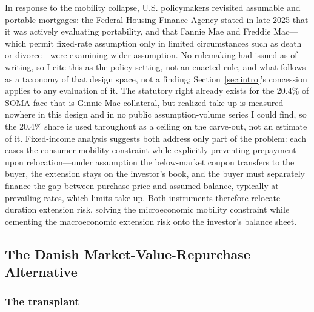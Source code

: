 \documentclass[12pt]{article}
\begin{document}
In response to the mobility collapse, U.S. policymakers revisited assumable and portable mortgages: the Federal Housing Finance Agency stated in late 2025 that it was actively evaluating portability, and that Fannie Mae and Freddie Mac---which permit fixed-rate assumption only in limited circumstances such as death or divorce---were examining wider assumption. No rulemaking had issued as of writing, so I cite this as the policy setting, not an enacted rule, and what follows as a taxonomy of that design space, not a finding; Section~\ref{sec:intro}'s concession applies to any evaluation of it. The statutory right already exists for the 20.4\% of SOMA face that is Ginnie Mae collateral, but realized take-up is measured nowhere in this design and in no public assumption-volume series I could find, so the 20.4\% share is used throughout as a ceiling on the carve-out, not an estimate of it. Fixed-income analysis suggests both address only part of the problem: each eases the consumer mobility constraint while explicitly preventing prepayment upon relocation---under assumption the below-market coupon transfers to the buyer, the extension stays on the investor's book, and the buyer must separately finance the gap between purchase price and assumed balance, typically at prevailing rates, which limits take-up. Both instruments therefore relocate duration extension risk, solving the microeconomic mobility constraint while cementing the macroeconomic extension risk onto the investor's balance sheet.

\subsection{The Danish Market-Value-Repurchase Alternative}\label{sec:abm-danish}

\subsubsection{The transplant}
\end{document}
